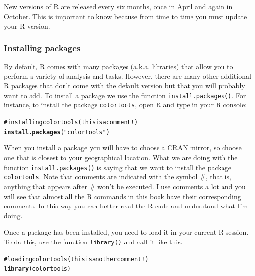 \documentclass[12pt]{book}\usepackage{graphicx, color}
\makeatletter
\newcommand{\hlfunctioncall}[1]{\textcolor[rgb]{0.501960784313725,0,0.329411764705882}{\textbf{#1}}}%
\newcommand{\hlstring}[1]{\textcolor[rgb]{0.6,0.6,1}{#1}}%
\newcommand{\hlcomment}[1]{\textcolor[rgb]{0.180392156862745,0.6,0.341176470588235}{#1}}%
\newenvironment{kframe}{%
 \def\at@end@of@kframe{}%
 \ifinner\ifhmode%
  \def\at@end@of@kframe{\end{minipage}}%
  \begin{minipage}{\columnwidth}%
 \fi\fi%
 \def\FrameCommand##1{\hskip\@totalleftmargin \hskip-\fboxsep
 \colorbox{shadecolor}{##1}\hskip-\fboxsep
     \hskip-\linewidth \hskip-\@totalleftmargin \hskip\columnwidth}%
 \MakeFramed {\advance\hsize-\width
   \@totalleftmargin\z@ \linewidth\hsize
   \@setminipage}}%
 {\par\unskip\endMakeFramed%
 \at@end@of@kframe}
\newenvironment{knitrout}{}{} %
\newcommand{\code}[1]{\texttt{#1}}
\makeatother
\begin{document}
New versions of R are released every six months, once in April and again in October. This is important to know because from time to time you must update your R version.


\subsubsection*{Installing packages}
By default, R comes with many packages (a.k.a. libraries) that allow you to perform a variety of analysis and tasks. However, there are many other additional R packages that don't come with the default version but that you will probably want to add. To install a package we use the function \texttt{install.packages()}. For instance, to install the package \code{colortools}, open R and type in your R console:
\begin{knitrout}
\color{fgcolor}\begin{kframe}
\begin{alltt}
\hlcomment{# installing colortools (this is a comment!)}
\hlfunctioncall{install.packages}(\hlstring{"colortools"})
\end{alltt}
\end{kframe}
\end{knitrout}

When you install a package you will have to choose a CRAN mirror, so choose one that is closest to your geographical location. What we are doing with the function \texttt{install.packages()} is saying that we want to install the package \code{colortools}. Note that comments are indicated with the symbol \#, that is, anything that appears after \# won't be executed. I use comments a lot and you will see that almost all the R commands in this book have their corresponding comments. In this way you can better read the R code and understand what I'm doing.

Once a package has been installed, you need to load it in your current R session. To do this, use the function \texttt{library()} and call it like this:
\begin{knitrout}
\color{fgcolor}\begin{kframe}
\begin{alltt}
\hlcomment{# loading colortools (this is another comment!)}
\hlfunctioncall{library}(colortools)
\end{alltt}
\end{kframe}
\end{knitrout}
\end{document}

